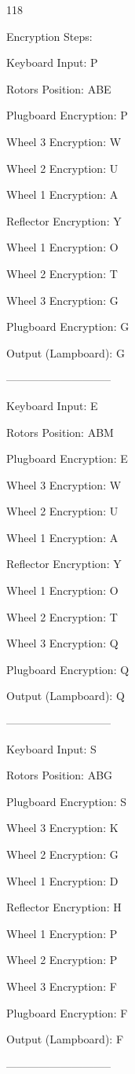 \documentclass{article}
\begin{document}

118

Encryption Steps:

Keyboard Input: P

Rotors Position: ABE

Plugboard Encryption: P

Wheel 3 Encryption: W

Wheel 2 Encryption: U

Wheel 1 Encryption: A

Reflector Encryption: Y

Wheel 1 Encryption: O

Wheel 2 Encryption: T

Wheel 3 Encryption: G

Plugboard Encryption: G

Output (Lampboard): G

-----------------------------

Keyboard Input: E

Rotors Position: ABM

Plugboard Encryption: E

Wheel 3 Encryption: W

Wheel 2 Encryption: U

Wheel 1 Encryption: A

Reflector Encryption: Y

Wheel 1 Encryption: O

Wheel 2 Encryption: T

Wheel 3 Encryption: Q

Plugboard Encryption: Q

Output (Lampboard): Q

-----------------------------

Keyboard Input: S

Rotors Position: ABG

Plugboard Encryption: S

Wheel 3 Encryption: K

Wheel 2 Encryption: G

Wheel 1 Encryption: D

Reflector Encryption: H

Wheel 1 Encryption: P

Wheel 2 Encryption: P

Wheel 3 Encryption: F

Plugboard Encryption: F

Output (Lampboard): F

-----------------------------
\end{document}

